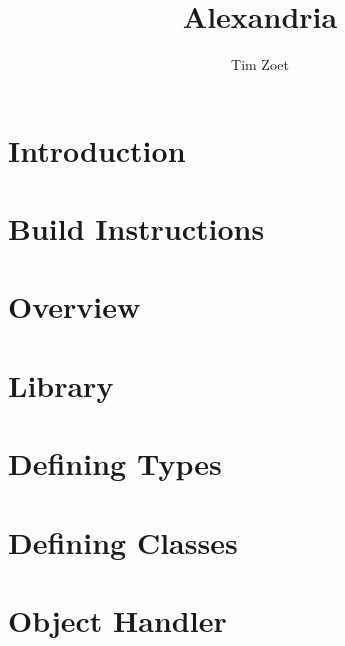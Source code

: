 \documentclass[twoside,a4paper,smallborder=true]{refart}
\title{Alexandria}
\author{Tim Zoet}
\date{}
\begin{document}
\maketitle

\tableofcontents
\newpage

\section{Introduction}
\label{section:introduction}

\newpage

\section{Build Instructions}
\label{section:build}

\newpage

\section{Overview}
\label{section:overview}

\newpage

\section{Library}
\label{section:library}

\newpage

\section{Defining Types}
\label{section:types}

\newpage

\section{Defining Classes}
\label{section:classes}

\newpage

\section{Object Handler}
\label{section:object_handler}

\newpage

\printglossaries
\newpage

 
 
\printindex
\end{document}
